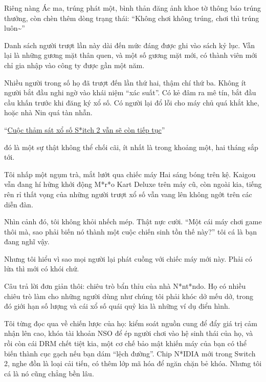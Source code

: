 \documentclass[../main.tex]{subfiles}
\begin{document}
Riêng nàng Ác ma, trúng phát một, bình thản đăng ảnh khoe tờ thông báo trúng thưởng, còn chèn thêm dòng trạng thái: ``Không chơi không trúng, chơi thì trúng luôn\~{}''

Danh sách người trượt lần này dài đến mức đáng được ghi vào sách kỷ lục. Vẫn lại là những gương mặt thân quen, và một số gương mặt mới, có thành viên mới chỉ gia nhập vào công ty được gần một năm.

Nhiều người trong số họ đã trượt đến lần thứ hai, thậm chí thứ ba. Không ít người bắt đầu nghi ngờ vào khái niệm ``xác suất''. Có kẻ đâm ra mê tín, bắt đầu cầu khấn trước khi đăng ký xổ số. Có người lại đổ lỗi cho máy chủ quá khắt khe, hoặc nhà Nin quá tàn nhẫn.

\ct


\begin{center}
    ``\uline{Cuộc thảm sát xổ số S*itch 2 vẫn sẽ còn tiếp tục}''
\end{center}

đó là một sự thật không thể chối cãi, ít nhất là trong khoảng một, hai tháng sắp tới.

Tôi nhấp một ngụm trà, mắt lướt qua chiếc máy Hai sáng bóng trên kệ. Kaigou vẫn đang hí hửng khởi động M*r*o Kart Deluxe trên máy cũ, còn ngoài kia, tiếng rên rỉ thất vọng của những người trượt xổ số vẫn vang lên không ngớt trên các diễn đàn.

Nhìn cảnh đó, tôi không khỏi nhếch mép. Thật nực cười. ``Một cái máy chơi game thôi mà, sao phải biến nó thành một cuộc chiến sinh tồn thế này?'' tôi cá là bạn đang nghĩ vậy.

Nhưng tôi hiểu vì sao mọi người lại phát cuồng với chiếc máy mới này. Phải có lửa thì mới có khói chứ.

Câu trả lời đơn giản thôi: chiêu trò bẩn thỉu của nhà N*nt*ndo. Họ có nhiều chiêu trò làm cho những người dùng như chúng tôi phải khóc dở mếu dở, trong đó giới hạn số lượng và cái xổ số quái quỷ kia là những ví dụ điển hình.

Tôi từng đọc qua về chiến lược của họ: kiểm soát nguồn cung để đẩy giá trị cảm nhận lên cao, khóa tài khoản NSO để ép người chơi vào hệ sinh thái của họ, và rồi còn cái DRM chết tiệt kia, một cơ chế bảo mật khiến máy của bạn có thể biến thành cục gạch nếu bạn dám ``lệch đường''. Chip N*IDIA mới trong Switch 2, nghe đồn là loại cải tiến, có thêm lớp mã hóa để ngăn chặn bẻ khóa. Nhưng tôi cá là nó cũng chẳng bền lâu.
\end{document}
